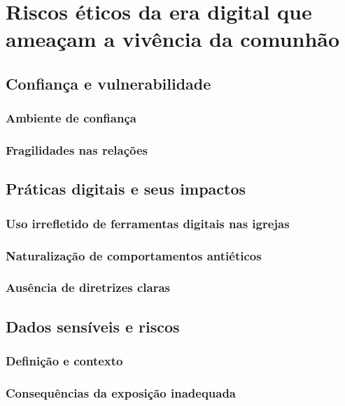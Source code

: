 \newpage
\section{Riscos éticos da era digital que ameaçam a vivência da comunhão}

\subsection{Confiança e vulnerabilidade}

\subsubsection{Ambiente de confiança}

\subsubsection{Fragilidades nas relações}

\subsection{Práticas digitais e seus impactos}

\subsubsection{Uso irrefletido de ferramentas digitais nas igrejas}

\subsubsection{Naturalização de comportamentos antiéticos}

\subsubsection{Ausência de diretrizes claras}

\subsection{Dados sensíveis e riscos}

\subsubsection{Definição e contexto}

\subsubsection{Consequências da exposição inadequada}

